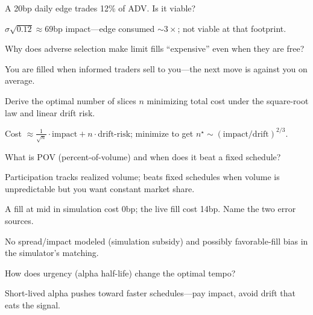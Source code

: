 \begin{exercise}
A 20bp daily edge trades 12\% of ADV. Is it viable?
\end{exercise}
\begin{solution}
$\sigma\sqrt{0.12}\approx69$bp impact---edge consumed $\sim3\times$; not viable at that
footprint.
\end{solution}

\begin{exercise}
Why does adverse selection make limit fills ``expensive'' even when they are free?
\end{exercise}
\begin{solution}
You are filled when informed traders sell to you---the next move is against you on average.
\end{solution}

\begin{exercise}
Derive the optimal number of slices $n$ minimizing total cost under the square-root law
and linear drift risk.
\end{exercise}
\begin{solution}
Cost $\approx \frac{1}{\sqrt n}\cdot\text{impact} + n\cdot\text{drift-risk}$; minimize to
get $n^\star\sim(\text{impact}/\text{drift})^{2/3}$.
\end{solution}

\begin{exercise}
What is POV (percent-of-volume) and when does it beat a fixed schedule?
\end{exercise}
\begin{solution}
Participation tracks realized volume; beats fixed schedules when volume is unpredictable
but you want constant market share.
\end{solution}

\begin{exercise}
A fill at mid in simulation cost 0bp; the live fill cost 14bp. Name the two error sources.
\end{exercise}
\begin{solution}
No spread/impact modeled (simulation subsidy) and possibly favorable-fill bias in the
simulator's matching.
\end{solution}

\begin{exercise}
How does urgency (alpha half-life) change the optimal tempo?
\end{exercise}
\begin{solution}
Short-lived alpha pushes toward faster schedules---pay impact, avoid drift that eats the
signal.
\end{solution}

